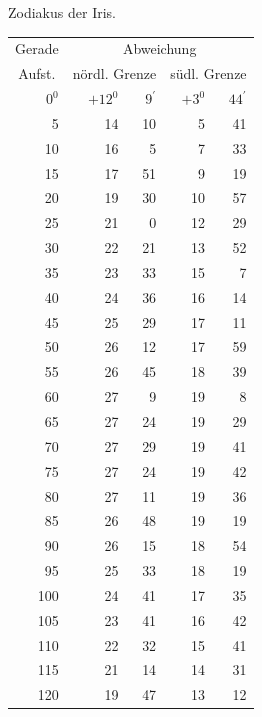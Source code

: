 \begin{center}
Zodiakus der Iris.
\end{center}
\begingroup\small
\setlength{\tabcolsep}{7pt}
\renewcommand{\arraystretch}{1.15}
\begin{center}
\begin{tabular}{|r|r@{\;}r|r@{\;}r|}
\multicolumn{1}{|c|}{Gerade}&\multicolumn{4}{c|}{Abweichung}\\
\multicolumn{1}{|c|}{Aufst.}&\multicolumn{2}{c|}{nördl. Grenze}&\multicolumn{2}{c|}{südl. Grenze}\\
\(0^{0}\)&\(+12^{0}\)&\(9^{\prime}\)&\(+3^{0}\)&\(44^{\prime}\)\\
5&14&10&5&41\\
10&16&5&7&33\\
15&17&51&9&19\\
20&19&30&10&57\\
25&21&0&12&29\\
30&22&21&13&52\\
35&23&33&15&7\\
40&24&36&16&14\\
45&25&29&17&11\\
50&26&12&17&59\\
55&26&45&18&39\\
60&27&9&19&8\\
65&27&24&19&29\\
70&27&29&19&41\\
75&27&24&19&42\\
80&27&11&19&36\\
85&26&48&19&19\\
90&26&15&18&54\\
95&25&33&18&19\\
100&24&41&17&35\\
105&23&41&16&42\\
110&22&32&15&41\\
115&21&14&14&31\\
120&19&47&13&12\\\hline
\end{tabular}
\end{center}
